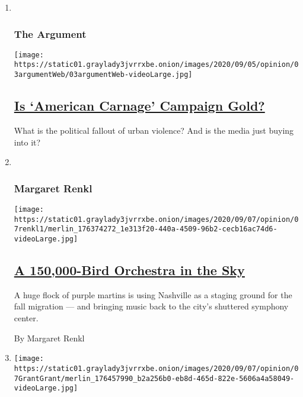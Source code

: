 \begin{enumerate}
\def\labelenumi{\arabic{enumi}.}
\item ~
  \hypertarget{the-argument}{%
  \subsubsection{The Argument}\label{the-argument}}

  \texttt{[image: https://static01.graylady3jvrrxbe.onion/images/2020/09/05/opinion/03argumentWeb/03argumentWeb-videoLarge.jpg]}

  \hypertarget{is-american-carnage-campaign-gold}{%
  \subsection{\texorpdfstring{\href{/2020/09/03/opinion/the-argument-trump-biden-kenosha-portland.html}{Is
  `American Carnage' Campaign
  Gold?}}{Is `American Carnage' Campaign Gold?}}\label{is-american-carnage-campaign-gold}}

  What is the political fallout of urban violence? And is the media just
  buying into it?
\item ~
  \hypertarget{margaret-renkl}{%
  \subsubsection{Margaret Renkl}\label{margaret-renkl}}

  \texttt{[image: https://static01.graylady3jvrrxbe.onion/images/2020/09/07/opinion/07renkl1/merlin\_176374272\_1e313f20-440a-4509-96b2-cecb16ac74d6-videoLarge.jpg]}

  \hypertarget{a-150000-bird-orchestra-in-the-sky}{%
  \subsection{\texorpdfstring{\href{/2020/09/07/opinion/a-150000-bird-orchestra-in-the-sky.html}{A
  150,000-Bird Orchestra in the
  Sky}}{A 150,000-Bird Orchestra in the Sky}}\label{a-150000-bird-orchestra-in-the-sky}}

  A huge flock of purple martins is using Nashville as a staging ground
  for the fall migration --- and bringing music back to the city's
  shuttered symphony center.

  By Margaret Renkl
\item
  \texttt{[image: https://static01.graylady3jvrrxbe.onion/images/2020/09/07/opinion/07GrantGrant/merlin\_176457990\_b2a256b0-eb8d-465d-822e-5606a4a58049-videoLarge.jpg]}


\end{enumerate}
